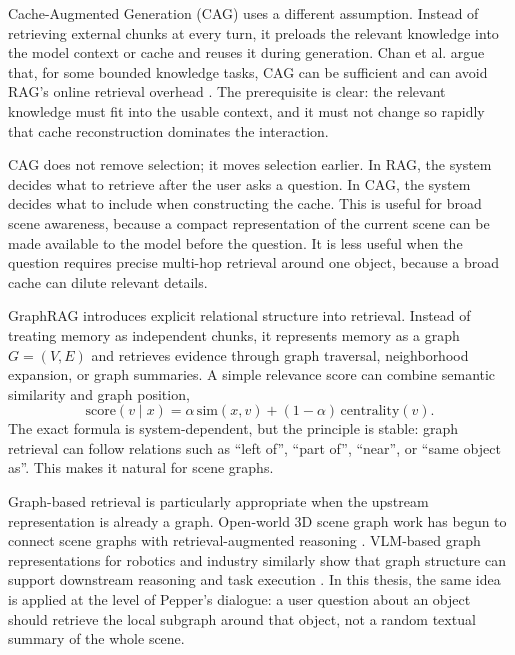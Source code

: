 Cache-Augmented Generation (CAG) uses a different assumption. Instead of retrieving external chunks at every turn, it preloads the relevant knowledge into the model context or cache and reuses it during generation. Chan et al. argue that, for some bounded knowledge tasks, CAG can be sufficient and can avoid RAG's online retrieval overhead \cite{Chan_2025}. The prerequisite is clear: the relevant knowledge must fit into the usable context, and it must not change so rapidly that cache reconstruction dominates the interaction.

CAG does not remove selection; it moves selection earlier. In RAG, the system decides what to retrieve after the user asks a question. In CAG, the system decides what to include when constructing the cache. This is useful for broad scene awareness, because a compact representation of the current scene can be made available to the model before the question. It is less useful when the question requires precise multi-hop retrieval around one object, because a broad cache can dilute relevant details.

GraphRAG introduces explicit relational structure into retrieval. Instead of treating memory as independent chunks, it represents memory as a graph \(G=(V,E)\) and retrieves evidence through graph traversal, neighborhood expansion, or graph summaries. A simple relevance score can combine semantic similarity and graph position,
\[
\mathrm{score}(v\mid x)=\alpha\,\mathrm{sim}(x,v)+(1-\alpha)\,\mathrm{centrality}(v).
\]
The exact formula is system-dependent, but the principle is stable: graph retrieval can follow relations such as \enquote{left of}, \enquote{part of}, \enquote{near}, or \enquote{same object as}. This makes it natural for scene graphs.

Graph-based retrieval is particularly appropriate when the upstream representation is already a graph. Open-world 3D scene graph work has begun to connect scene graphs with retrieval-augmented reasoning \cite{yu_open-world_2025}. VLM-based graph representations for robotics and industry similarly show that graph structure can support downstream reasoning and task execution \cite{li_vlm-msgraph_2025,wang_indvissgg_2025}. In this thesis, the same idea is applied at the level of Pepper's dialogue: a user question about an object should retrieve the local subgraph around that object, not a random textual summary of the whole scene.

